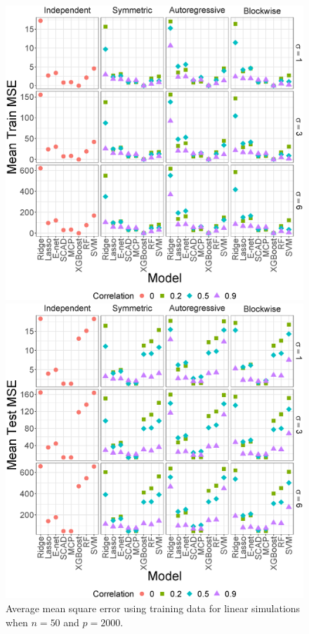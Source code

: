\documentclass{article}
\begin{document}
	\begin{figure}[t!]
		\centering
		\begin{minipage}[t]{0.47\textwidth}
			\includegraphics[width = \textwidth]{images/facet/publication_facet_train_mse_1_50_2000.eps}
			\captionsetup{width = 0.95\textwidth}
			\caption{Average mean square error using training data for linear simulations when $n = 50$ and $p = 	2000$.}
			\label{fig:linear-train-mse}
		\end{minipage}
		\hspace{6pt}
		\begin{minipage}[t]{0.47\textwidth}
			\includegraphics[width = \textwidth]{images/facet/publication_facet_test_mse_1_50_2000.eps}

\end{minipage}
\end{figure}
\end{document}
